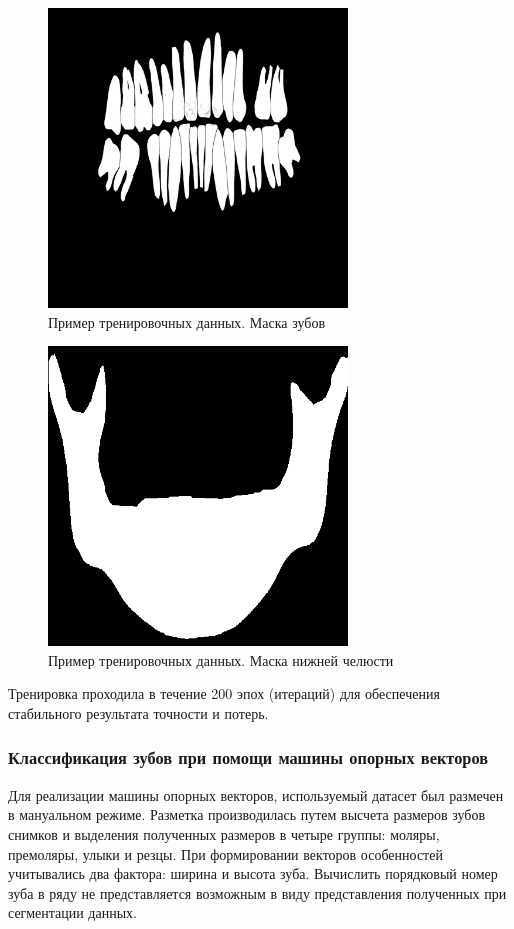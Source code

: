 \begin{figure}[H]
	\centering
	\includegraphics[width=300px]{img/teeth.png}
	\caption{Пример тренировочных данных. Маска зубов}
	\label{fig:teeth}
\end{figure}

\begin{figure}[H]
	\centering
	\includegraphics[width=300px]{img/mandible.png}
	\caption{Пример тренировочных данных. Маска нижней челюсти}
	\label{fig:mandible}
\end{figure}

Тренировка проходила в течение 200 эпох (итераций) для обеспечения стабильного результата точности и потерь.

\subsubsection{Классификация зубов при помощи машины опорных векторов}

Для реализации машины опорных векторов, используемый датасет был размечен в мануальном режиме. Разметка производилась путем высчета размеров зубов снимков и выделения полученных размеров в четыре группы: моляры, премоляры, улыки и резцы. При формировании векторов особенностей учитывались два фактора: ширина и высота зуба. Вычислить порядковый номер зуба в ряду не представляется возможным в виду представления полученных при сегментации данных.

